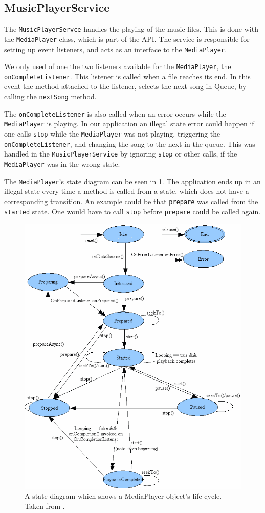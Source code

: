\subsection{MusicPlayerService} 
The \texttt{MusicPlayerServce} handles the playing of the music files. This is done with the \texttt{MediaPlayer} class, which is part of the \citet{android:MediaPlayer} API. The service is responsible for setting up event listeners, and acts as an interface to the \texttt{MediaPlayer}.  

We only used of one the two listeners available for the \texttt{MediaPlayer}, the \texttt{onCompleteListener}. This listener is called when a file reaches its end. In this event the method attached to the listener, selects the next song in Queue, by calling the \texttt{nextSong} method. 

The \texttt{onCompleteListener} is also called when an error occurs while the \texttt{MediaPlayer} is playing. In our application an illegal state error could happen if one calls \texttt{stop} while the \texttt{MediaPlayer} was not playing, triggering the \texttt{onCompleteListener}, and changing the song to the next in the queue. This was handled in the \texttt{MusicPlayerService} by ignoring \texttt{stop} or other calls, if the \texttt{MediaPlayer} was in the wrong state. 

The \texttt{MediaPlayer}'s state diagram can be seen in \cref{fig:medaiPlayerState}. The application ends up in an illegal state every time a method is called from a state, which does not have a corresponding transition. An example could be that \texttt{prepare} was called from the \texttt{started} state. One would have to call \texttt{stop} before \texttt{prepare} could be called again.

\begin{figure}[h!]
  \centering
    \includegraphics[width=\textwidth]{Images/mediaplayerStateDiagram.png}
  \caption{A state diagram which shows a MediaPlayer object's life cycle. Taken from \citet{android:MediaPlayer}.}
  \label{fig:medaiPlayerState}
\end{figure}
